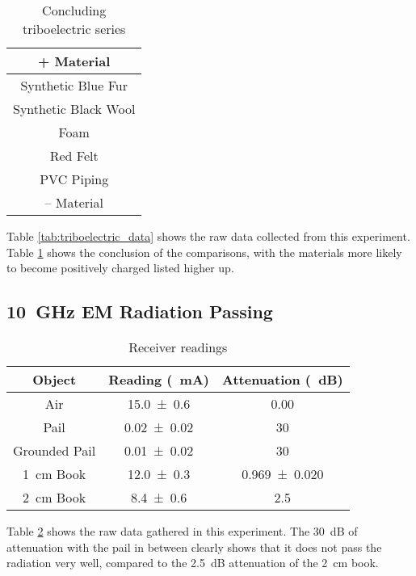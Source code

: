 \documentclass[a4paper]{scrartcl}
\begin{document}
\begin{table}
    \centering
    \begin{tabular}{| c |}
        + Material \\
        \hline
        Synthetic Blue Fur \\
        Synthetic Black Wool \\
        Foam \\
        Red Felt \\
        PVC Piping \\
        \hline
        -- Material
    \end{tabular}
    \caption{Concluding triboelectric series}
    \label{tab:triboelectric_series}
\end{table}

Table \ref{tab:triboelectric_data} shows the raw data collected from this experiment. Table \ref{tab:triboelectric_series} shows the conclusion of the comparisons, with the materials more likely to become positively charged listed higher up.

\subsection{\SI{10}{\giga\hertz} EM Radiation Passing}
\begin{table}
    \centering
    \begin{tabular}{c | c | c}
        Object & Reading (\SI{}{\milli\ampere}) & Attenuation (\SI{}{\deci\bel}) \\
        \hline
        Air & \SI{15.0 \pm 0.6}{} & \SI{0.00}{} \\
        Pail & \SI{0.02 \pm 0.02}{} & \SI{30}{} \\
        Grounded Pail & \SI{0.01 \pm 0.02}{} & \SI{30}{} \\
        \SI{1}{\centi\metre} Book & \SI{12.0 \pm 0.3}{} & \SI{0.969 \pm 0.020}{} \\
        \SI{2}{\centi\metre} Book & \SI{8.4 \pm 0.6}{} & \SI{2.5}{} \\
        \hline
    \end{tabular}
    \caption{Receiver readings}
    \label{tab:em_data}
\end{table}

Table \ref{tab:em_data} shows the raw data gathered in this experiment. The \SI{30}{\deci\bel} of attenuation with the pail in between clearly shows that it does not pass the radiation very well, compared to the \SI{2.5}{\deci\bel} attenuation of the \SI{2}{\centi\metre} book.
\end{document}

